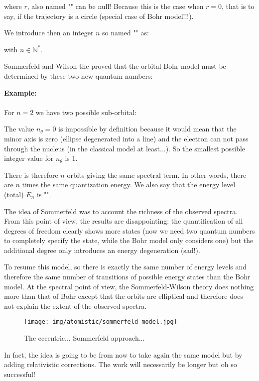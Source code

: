 	where $r$, also named "" can be null! Because this is the case when $\dot{r}=0$, that is to say, if the trajectory is a circle (special case of Bohr model!!!).
	
	We introduce then an integer $n$ so named "" as:
	
	with $n\in \mathbb{N}^*$.
	
	Sommerfeld and Wilson the proved that the orbital Bohr model must be determined by these two new quantum numbers:
	\begin{tcolorbox}[colframe=black,colback=white,sharp corners]
	\textbf{{\Large {}}Example:}\\\\
	For $n=2$ we have two possible sub-orbital:
	
	\end{tcolorbox}
	The value $n_\theta=0$ is impossible by definition because it would mean that the minor axis is zero (ellipse degenerated into a line) and the electron can not pass through the nucleus (in the classical model at least...). So the smallest possible integer value for $n_\theta$ is $1$.
	
	There is therefore $n$ orbits giving the same spectral term. In other words, there are $n$ times the same quantization energy. We also say that the energy level (total) $E_n$ is "".
	
	The idea of Sommerfeld was to account the richness of the observed spectra. From this point of view, the results are disappointing: the quantification of all degrees of freedom clearly shows more states (now we need two quantum numbers to completely specify the state, while the Bohr model only considers one) but the additional degree only introduces an energy degeneration (sad!).
	
	To resume this model, so there is exactly the same number of energy levels and therefore the same number of transitions of possible energy states than the Bohr model. At the spectral point of view, the Sommerfeld-Wilson theory does nothing more than that of Bohr except that the orbits are elliptical and therefore does not explain the extent of the observed spectra.
	\begin{figure}[H]
		\centering
		\texttt{[image: img/atomistic/sommerfeld\_model.jpg]}
		\caption{The eccentric... Sommerfeld approach...}
	\end{figure}
	In fact, the idea is going to be from now to take again the same model but by adding relativistic corrections. The work will necessarily be longer but oh so successful!
	
